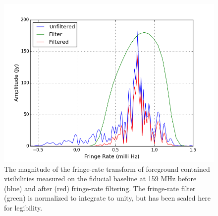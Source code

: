 \documentclass[twocolumn,numberedappendix]{emulateapj} \shorttitle{New Limits on the 21 cm Power Spectrum at $z=8.4$}
\begin{document}
\begin{figure}\centering
\includegraphics[width=\columnwidth]{plots/fr_preserved_signal.png}
\caption{
The magnitude of the fringe-rate transform of foreground contained visibilities measured on the fiducial baseline at 159 MHz before (blue) and
after (red) fringe-rate filtering. The fringe-rate filter (green) is normalized
to integrate to unity, but has been scaled here for legibility.
}
\label{fig:fr_preserved_signal}
\end{figure}
\end{document}
